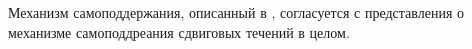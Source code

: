 Механизм самоподдержания, описанный в \cite{Shimizu2009}, согласуется с представления о механизме самоподдреания сдвиговых течений в целом. 
\begin{comment}
In the vicinity of a wall, turbulent flow is often found to be highly organized as there exist regions, called coherent structures, where the fluid motion is more strongly correlated than in full turbulence. In figure 1.2.1(a) a flow visualization of a turbulent boundary layer is reproduced from Kline et al. (1967), showing alternating regions of low- and high-speed fluid, elongated in the streamwise direction. The spanwise spacing between these so-called streaks is best expressed in wall units, which are based on the wall shear stress τ W = μ∂u/∂y| y=0 q , with μ = νρ the dynamic viscosity + of the fluid. A length scale is defined by l = ν/ τ W /ρ and the spacing is universally observed to be ∼ 100l + (Klebanoff et al., 1962; Kline et al., 1967). Further investigations (see e.g. Blackwelder and Eckelmann, 1979) reveal the existence of downstream vortices, occuring in counter-rotating pairs. Through linear advection, these vortices push fluid from the high-speed free stream towards the wall, thus creating and sustaining a high-speed streak. Vice versa, fluid is pulled from the wall into the free stream, resulting in a low-speed streak; this process of streak 51. Introduction
creation through downstream vortices is termed lift-up effect. Vortices in near-wall turbulence are typically not exactly parallel to the downstream direction but aligend at a small angle. They are furthermore slightly inclined from the wall (Jeong et al., 1997; Schoppa and Hussain, 2002).

\end{comment}

